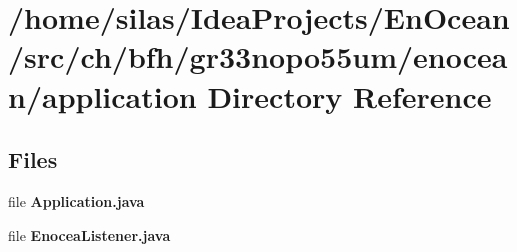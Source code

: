 \section{/home/silas/\+Idea\+Projects/\+En\+Ocean/src/ch/bfh/gr33nopo55um/enocean/application Directory Reference}
\label{dir_0347b4d9ce3520e9613518b6a362436e}
\subsection*{Files}
\begin{DoxyCompactItemize}
\item 
file {\bf Application.\+java}
\item 
file {\bf Enocea\+Listener.\+java}
\end{DoxyCompactItemize}

